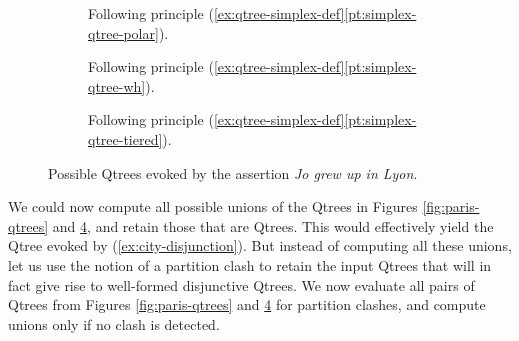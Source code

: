 \begin{figure}[H]
	\centering
	\begin{subfigure}[t]{.23\linewidth}
		\centering
		\caption{Following principle (\ref{ex:qtree-simplex-def}\ref{pt:simplex-qtree-polar}).}\label{fig:lyon-qtree-polar}
	\end{subfigure}
	\hfill
	\begin{subfigure}[t]{.33\linewidth}
		\centering		{}
		\caption{Following principle (\ref{ex:qtree-simplex-def}\ref{pt:simplex-qtree-wh}).}\label{fig:lyon-qtree-wh}
	\end{subfigure}
	\hfill
	\begin{subfigure}[t]{.38\linewidth}
		\centering{}
		\caption{Following principle (\ref{ex:qtree-simplex-def}\ref{pt:simplex-qtree-tiered}).}\label{fig:lyon-qtree-tiered}
	\end{subfigure}
	\caption{Possible Qtrees evoked by the assertion \textit{Jo grew up in Lyon}.}\label{fig:lyon-qtrees}
\end{figure}

We could now compute all possible unions of the Qtrees in Figures \ref{fig:paris-qtrees} and \ref{fig:lyon-qtrees}, and retain those that are Qtrees. This would effectively yield the Qtree evoked by (\ref{ex:city-disjunction}). But instead of computing all these unions, let us use the notion of a partition clash to retain the input Qtrees that will in fact give rise to well-formed disjunctive Qtrees. We now evaluate all pairs of Qtrees from Figures \ref{fig:paris-qtrees} and \ref{fig:lyon-qtrees} for partition clashes, and compute unions only if no clash is detected.

